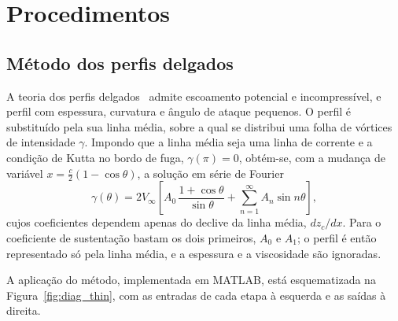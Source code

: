 \section*{Procedimentos}

\subsection*{Método dos perfis delgados}

A teoria dos perfis delgados~\cite{anderson} admite escoamento potencial e
incompressível, e perfil com espessura, curvatura e ângulo de ataque pequenos.
O perfil é substituído pela sua linha média, sobre a qual se distribui uma folha
de vórtices de intensidade $\gamma$. Impondo que a linha média seja uma linha de
corrente e a condição de Kutta no bordo de fuga, $\gamma(\pi) = 0$, obtém-se,
com a mudança de variável $x = \tfrac{c}{2}(1-\cos\theta)$, a solução em série
de Fourier
\[
  \gamma(\theta) = 2V_\infty\left[A_0\,\frac{1+\cos\theta}{\sin\theta}
  + \sum_{n=1}^{\infty} A_n \sin n\theta\right],
\]
cujos coeficientes dependem apenas do declive da linha média, $dz_c/dx$. Para o
coeficiente de sustentação bastam os dois primeiros, $A_0$ e $A_1$; o perfil é
então representado só pela linha média, e a espessura e a viscosidade são
ignoradas.

A aplicação do método, implementada em MATLAB, está esquematizada na
Figura~\ref{fig:diag_thin}, com as entradas de cada etapa à esquerda e as saídas
à direita.

